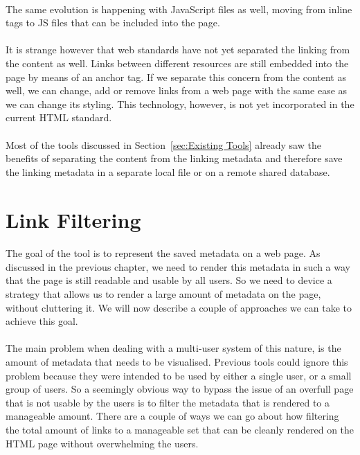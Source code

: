 	\paragraph{}
	The same evolution is happening with JavaScript files as well, moving from inline  tags to JS files that can be included into the page.
	\paragraph{}
	It is strange however that web standards have not yet separated the linking from the content as well. Links between different resources are still embedded into the page by means of an anchor tag. If we separate this concern from the content as well, we can change, add or remove links from a web page with the same ease as we can change its styling. This technology, however, is not yet incorporated in the current HTML standard.
	\paragraph{}
	Most of the tools discussed in Section~\ref{sec:Existing Tools} already saw the benefits of separating the content from the linking metadata and therefore save the linking metadata in a separate local file or on a remote shared database.

\section{Link Filtering} \label{sub:Link Filtering}
	\paragraph{}
	The goal of the tool is to represent the saved metadata on a web page. As discussed in the previous chapter, we need to render this metadata in such a way that the page is still readable and usable by all users. So we need to device a strategy that allows us to render a large amount of metadata on the page, without cluttering it. We will now describe a couple of approaches we can take to achieve this goal.
		\paragraph{}
		The main problem when dealing with a multi-user system of this nature, is the amount of metadata that needs to be visualised. Previous tools could ignore this problem because they were intended to be used by either a single user, or a small group of users. So a seemingly obvious way to bypass the issue of an overfull page that is not usable by the users is to filter the metadata that is rendered to a manageable amount. There are a couple of ways we can go about how filtering the total amount of links to a manageable set that can be cleanly rendered on the HTML page without overwhelming the users.

